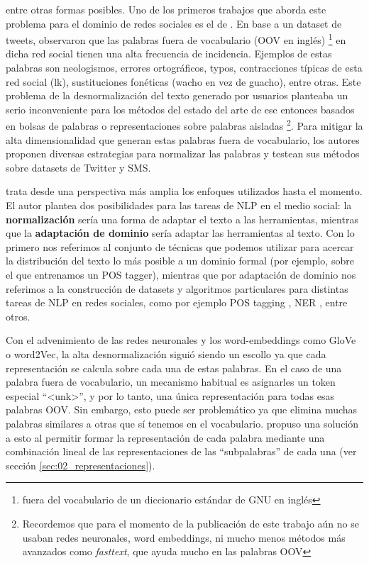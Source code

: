 \noindent entre otras formas posibles. Uno de los primeros trabajos que aborda este problema para el dominio de redes sociales es el de \citet{han2011lexical}. En base a un dataset de tweets, observaron que las palabras fuera de vocabulario (OOV en inglés) \footnote{fuera del vocabulario de un diccionario estándar de GNU en inglés} en dicha red social tienen una alta frecuencia de incidencia. Ejemplos de estas palabras son neologismos, errores ortográficos, typos, contracciones típicas de esta red social (lk), sustituciones fonéticas (wacho en vez de guacho), entre otras. Este problema de la desnormalización del texto generado por usuarios planteaba un serio inconveniente para los métodos del estado del arte de ese entonces basados en bolsas de palabras o representaciones sobre palabras aisladas \footnote{Recordemos que para el momento de la publicación de este trabajo aún no se usaban redes neuronales, word embeddings, ni mucho menos métodos más avanzados como \emph{fasttext}, que ayuda mucho en las palabras OOV}. Para mitigar la alta dimensionalidad que generan estas palabras fuera de vocabulario, los autores proponen diversas estrategias para normalizar las palabras y testean sus métodos sobre datasets de Twitter y SMS.

\citet{eisenstein2013bad} trata desde una perspectiva más amplia los enfoques utilizados hasta el momento. El autor plantea dos posibilidades para las tareas de NLP en el medio social: la \textbf{normalización} sería una forma de adaptar el texto a las herramientas, mientras que la \textbf{adaptación de dominio} sería adaptar las herramientas al texto. Con lo primero nos referimos al conjunto de técnicas que podemos utilizar para acercar la distribución del texto lo más posible a un dominio formal (por ejemplo, sobre el que entrenamos un POS tagger), mientras que por adaptación de dominio nos referimos a la construcción de datasets y algoritmos particulares para distintas tareas de NLP en redes sociales, como por ejemplo POS tagging \cite{gimpel2010part}, NER \cite{ritter2011named}, entre otros.

Con el advenimiento de las redes neuronales y los word-embeddings como GloVe o word2Vec, la alta desnormalización siguió siendo un escollo ya que cada representación se calcula sobre cada una de estas palabras. En el caso de una palabra fuera de vocabulario, un mecanismo habitual es asignarles un token especial ``<unk>'', y por lo tanto, una única representación para todas esas palabras OOV. Sin embargo, esto puede ser problemático ya que elimina muchas palabras similares a otras que sí tenemos en el vocabulario. \citet{bojanowski16} propuso una solución a esto al permitir formar la representación de cada palabra mediante una combinación lineal de las representaciones de las ``subpalabras'' de cada una (ver sección \ref{sec:02_representaciones}).

